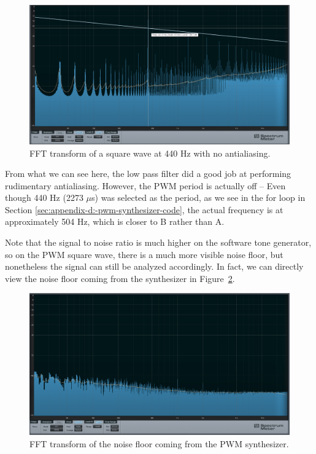 \documentclass[12pt]{article}
\begin{document}
\begin{figure}
    \centering
    \includegraphics[width = \textwidth]{FFT440NAA.png}
    \caption{FFT transform of a square wave at 440 Hz with no antialiasing. }
    \label{fig:tone440naa}
\end{figure}


From what we can see here, the low pass filter did a good job at performing rudimentary antialiasing. However, the PWM period is actually off -- Even though 440 Hz (2273 $\mu$s) was selected as the period, as we see in the for loop in Section \ref{sec:appendix-d:-pwm-synthesizer-code}, the actual frequency is at approximately 504 Hz, which is closer to B rather than A. 

Note that the signal to noise ratio is much higher on the software tone generator, so on the PWM square wave, there is a much more visible noise floor, but nonetheless the signal can still be analyzed accordingly. In fact, we can directly view the noise floor coming from the synthesizer in Figure~\ref{fig:noisefloor}. 

\begin{figure}
    \centering
    \includegraphics[width = \textwidth]{FFTnoisefloor.png}
    \caption{FFT transform of the noise floor coming from the PWM synthesizer. }
    \label{fig:noisefloor}
\end{figure}
\end{document}
